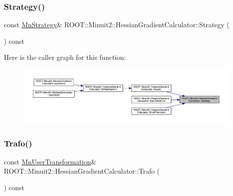 \mbox{\label{classROOT_1_1Minuit2_1_1HessianGradientCalculator_a407171e2df12fa67e92c0e5b7a97bb8d}} 
\subsubsection{\texorpdfstring{Strategy()}{Strategy()}\hspace{0.1cm}{\footnotesize\ttfamily [2/2]}}
{\footnotesize\ttfamily const \mbox{\hyperlink{classROOT_1_1Minuit2_1_1MnStrategy}{Mn\+Strategy}}\& R\+O\+O\+T\+::\+Minuit2\+::\+Hessian\+Gradient\+Calculator\+::\+Strategy (\begin{DoxyParamCaption}{ }\end{DoxyParamCaption}) const\hspace{0.3cm}{\ttfamily [inline]}}

Here is the caller graph for this function\+:\nopagebreak
\begin{figure}[H]
\begin{center}
\leavevmode
\includegraphics[width=350pt]{dc/d17/classROOT_1_1Minuit2_1_1HessianGradientCalculator_a407171e2df12fa67e92c0e5b7a97bb8d_icgraph}
\end{center}
\end{figure}
\mbox{\label{classROOT_1_1Minuit2_1_1HessianGradientCalculator_a4b122eecb0217cab813601572ccbac74}} 
\subsubsection{\texorpdfstring{Trafo()}{Trafo()}\hspace{0.1cm}{\footnotesize\ttfamily [1/2]}}
{\footnotesize\ttfamily const \mbox{\hyperlink{classROOT_1_1Minuit2_1_1MnUserTransformation}{Mn\+User\+Transformation}}\& R\+O\+O\+T\+::\+Minuit2\+::\+Hessian\+Gradient\+Calculator\+::\+Trafo (\begin{DoxyParamCaption}{ }\end{DoxyParamCaption}) const\hspace{0.3cm}{\ttfamily [inline]}}

